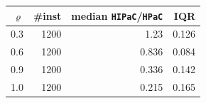 \begin{tabular}{@{}rrrr@{}}
\toprule
$\varrho$ & \#inst & median \texttt{HIPaC}/\texttt{HPaC} & IQR \\
\midrule
0.3 & 1200 & 1.23 & 0.126 \\
0.6 & 1200 & 0.836 & 0.084 \\
0.9 & 1200 & 0.336 & 0.142 \\
1.0 & 1200 & 0.215 & 0.165 \\
\bottomrule
\end{tabular}
